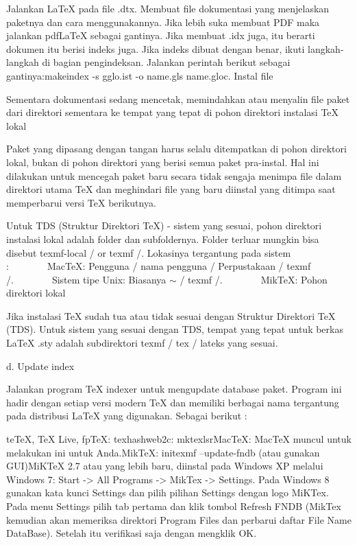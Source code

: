 Jalankan LaTeX pada file .dtx. Membuat file dokumentasi yang menjelaskan paketnya dan cara menggunakannya. Jika lebih suka membuat PDF maka jalankan pdfLaTeX sebagai gantinya. Jika membuat .idx juga, itu berarti dokumen itu berisi indeks juga. Jika indeks dibuat dengan benar, ikuti langkah-langkah di bagian pengindeksan. Jalankan perintah berikut sebagai gantinya:makeindex -s gglo.ist -o name.gls name.gloc. Instal file\par

Sementara dokumentasi sedang mencetak, memindahkan atau menyalin file paket dari direktori sementara ke tempat yang tepat di pohon direktori instalasi TeX lokal\par

Paket yang dipasang dengan tangan harus selalu ditempatkan di pohon direktori lokal, bukan di pohon direktori yang berisi semua paket pra-instal. Hal ini dilakukan untuk mencegah paket baru secara tidak sengaja menimpa file dalam direktori utama TeX dan meghindari file yang baru diinstal yang ditimpa saat memperbarui versi TeX berikutnya.\par

Untuk TDS (Struktur Direktori TeX) - sistem yang sesuai, pohon direktori instalasi lokal adalah folder dan subfoldernya. Folder terluar mungkin bisa disebut texmf-local / or texmf /. Lokasinya tergantung pada sistem :        MacTeX: Pengguna / nama pengguna / Perpustakaan / texmf /.        Sistem tipe Unix: Biasanya  $ \sim $  / texmf /.        MikTeX: Pohon direktori lokal \par

Jika instalasi TeX sudah tua atau tidak sesuai dengan Struktur Direktori TeX (TDS). Untuk sistem yang sesuai dengan TDS, tempat yang tepat untuk berkas LaTeX .sty adalah subdirektori texmf / tex / lateks yang sesuai.\par

d. Update index  \par

Jalankan program TeX indexer untuk mengupdate database paket. Program ini hadir dengan setiap versi modern TeX dan memiliki berbagai nama tergantung pada distribusi LaTeX yang digunakan. Sebagai berikut :\par

teTeX, TeX Live, fpTeX: texhashweb2c: mktexlsrMacTeX: MacTeX muncul untuk melakukan ini untuk Anda.MikTeX: initexmf --update-fndb (atau gunakan GUI)MiKTeX 2.7 atau yang lebih baru, diinstal pada Windows XP melalui Windows 7: Start -> All Programs -> MikTex -> Settings. Pada Windows 8 gunakan kata kunci Settings dan pilih pilihan Settings dengan logo MiKTex. Pada menu Settings pilih tab pertama dan klik tombol Refresh FNDB (MikTex kemudian akan memeriksa direktori Program Files dan perbarui daftar File Name DataBase). Setelah itu verifikasi saja dengan mengklik OK.\par

